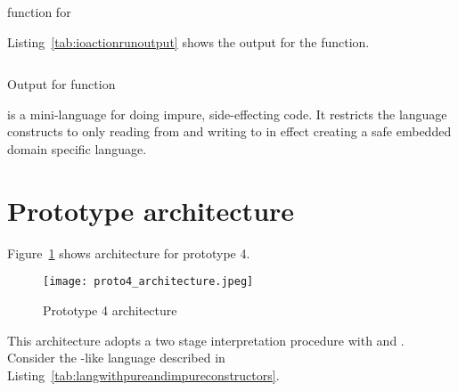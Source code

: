 \documentclass[thesis-solanki.tex]{subfiles}
\begin{document}
\begin{code-list}[H]
\begin{singlespace}
\inputminted{haskell}{haskell-proto4-ioaction-run.hs}
\end{singlespace}
\caption{ function for }
\label{tab:ioactionrun}
\end{code-list}

Listing~\ref{tab:ioactionrunoutput} shows the output for the  function.

\begin{code-list}[H]
\begin{singlespace}
\inputminted{haskell}{haskell-proto4-ioaction-run-output.hs}
\end{singlespace}
\caption{Output for  function}
\label{tab:ioactionrunoutput}
\end{code-list}

 is a mini-language for doing impure, side-effecting code.
It restricts the language constructs to only reading from  and writing to
 in effect creating a safe embedded domain specific language.

\begin{comment}
\begin{code-list}[H]
\begin{singlespace}
  \inputminted[linenos]{haskell}{haskell-proto4-purvey-wincer.hs}
\end{singlespace}
\caption{\protect\haskellConstruct{IOAction} definitions}
\label{lis:IOAction}
\end{code-list}
\end{comment}

\newpage

\section{Prototype architecture}
Figure~\ref{fig:proto4architecture} shows architecture for prototype 4.

\begin{figure}[H]
  \centering
  \texttt{[image: proto4\_architecture.jpeg]}
  \caption{Prototype 4 architecture}
  \label{fig:proto4architecture}
\end{figure}

This architecture adopts a two stage interpretation procedure with  and . Consider the 
-like language described in Listing~\ref{tab:langwithpureandimpureconstructors}.
\end{document}
